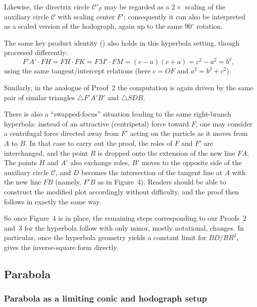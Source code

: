 Likewise, the directrix circle $\mathcal{C'}_{F}$ may be regarded as a $2\times$ scaling of the auxiliary circle $\mathcal C$ with scaling center $F'$; consequently it can also be interpreted as a scaled version of the hodograph, again up to the same $90^\circ$ rotation.

The same key product identity () also holds in this hyperbola setting, though processed differently:
\begin{equation}
  F'\!A'\cdot FH = FH\cdot FK = F\!M'\cdot FM = (c-a)(c+a)=c^2-a^2=b^2,
\end{equation}
using the same tangent/intercept relations (here $c=OF$ and $a^2=b^2+c^2$).

Similarly, in the analogue of Proof~2 the computation is again driven by the same pair of similar triangles $\triangle F'\!A'B'$ and $\triangle SDB$.

There is also a ``swapped-focus'' situation leading to the same right-branch hyperbola: instead of an attractive (centripetal) force toward $F$, one may consider a centrifugal force directed away from $F'$ acting on the particle as it moves from $A$ to $B$.
In that case to carry out the proof, the roles of $F$ and $F'$ are interchanged, and the point $R$ is dropped onto the extension of the new line $FA$.
The points $H$ and $A'$ also exchange roles, $B'$ moves to the opposite side of the auxiliary circle $\mathcal C$, and $D$ becomes the intersection of the tangent line at $A$ with the new line $FB$ (namely, $F'B$ as in Figure~4). Readers should be able to construct the modified plot accordingly without difficulty, and the proof then follows in exactly the same way.

So once Figure~4 is in place, the remaining steps corresponding to our Proofs~2 and~3 for the hyperbola follow with only minor, mostly notational, changes. In particular, once the hyperbola geometry yields a constant limit for $BD/BR^2$,  gives the inverse-square form directly.

\subsection{Parabola}
\label{subsec:parabola}

\subsubsection{Parabola as a limiting conic and hodograph setup}
\label{subsubsec:parabola-general}

